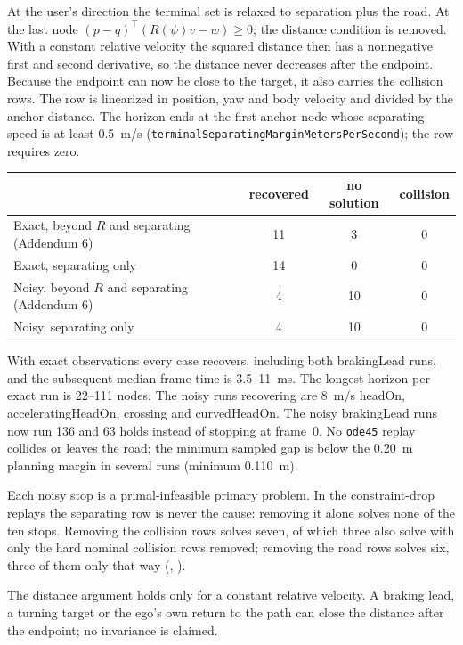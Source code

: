 \documentclass[11pt]{article}
\begin{document}
At the user's direction the terminal set is relaxed to separation plus the
road. At the last node $(p-q)^\top(R(\psi)v-w)\ge0$; the distance condition is
removed. With a constant relative velocity the squared distance then has a
nonnegative first and second derivative, so the distance never decreases after
the endpoint. Because the endpoint can now be close to the target, it also
carries the collision rows. The row is linearized in position, yaw and body
velocity and divided by the anchor distance. The horizon ends at the first
anchor node whose separating speed is at least 0.5~m/s
(\texttt{terminalSeparatingMarginMetersPerSecond}); the row requires zero.

\begin{center}
\begin{tabular}{lccc}
\toprule
 & recovered & no solution & collision\\
\midrule
Exact, beyond $R$ and separating (Addendum 6) & 11 & 3 & 0\\
Exact, separating only & 14 & 0 & 0\\
Noisy, beyond $R$ and separating (Addendum 6) & 4 & 10 & 0\\
Noisy, separating only & 4 & 10 & 0\\
\bottomrule
\end{tabular}
\end{center}

With exact observations every case recovers, including both brakingLead runs,
and the subsequent median frame time is 3.5--11~ms. The longest horizon per exact run is
22--111 nodes. The noisy runs recovering are 8~m/s headOn,
acceleratingHeadOn, crossing and curvedHeadOn. The noisy brakingLead runs now
run 136 and 63 holds instead of stopping at frame~0. No \texttt{ode45} replay
collides or leaves the road; the minimum sampled gap is below the 0.20~m
planning margin in several runs (minimum 0.110~m).

Each noisy stop is a primal-infeasible primary problem. In the constraint-drop
replays the separating row is never the cause: removing it alone solves none of
the ten stops. Removing the collision rows solves seven, of which three also
solve with only the hard nominal collision rows removed; removing the road rows
solves six, three of them only that way
(, ).

The distance argument holds only for a constant relative velocity. A braking
lead, a turning target or the ego's own return to the path can close the
distance after the endpoint; no invariance is claimed.
\end{document}
